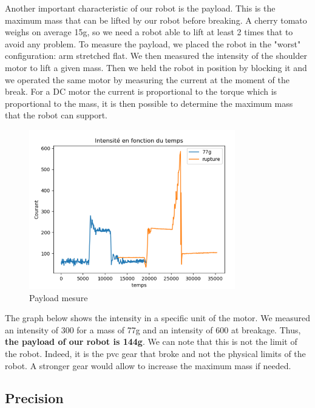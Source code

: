 \hspace{\parindent} Another important characteristic of our robot is the payload. This is the maximum mass that can be lifted by our robot before breaking. A cherry tomato weighs on average 15g, so we need a robot able to lift at least 2 times that to avoid any problem. To measure the payload, we placed the robot in the "worst" configuration: arm stretched flat. We then measured the intensity of the shoulder motor to lift a given mass. Then we held the robot in position by blocking it and we operated the same motor by measuring the current at the moment of the break. For a DC motor the current is proportional to the torque which is proportional to the mass, it is then possible to determine the maximum mass that the robot can support. 
\begin{figure}[ht]
    \centering
    \includegraphics[width=0.8\textwidth]{images/Section04/payload.png}
    \caption{Payload mesure}
    \label{fig:mesh25}
\end{figure}
\FloatBarrier

The graph below shows the intensity in a specific unit of the motor. We measured an intensity of 300 for a mass of 77g and an intensity of 600 at breakage. Thus, \textbf{the payload of our robot is 144g}. We can note that this is not the limit of the robot. Indeed, it is the pvc gear that broke and not the physical limits of the robot. A stronger gear would allow to increase the maximum mass if needed.

\subsection{Precision}

